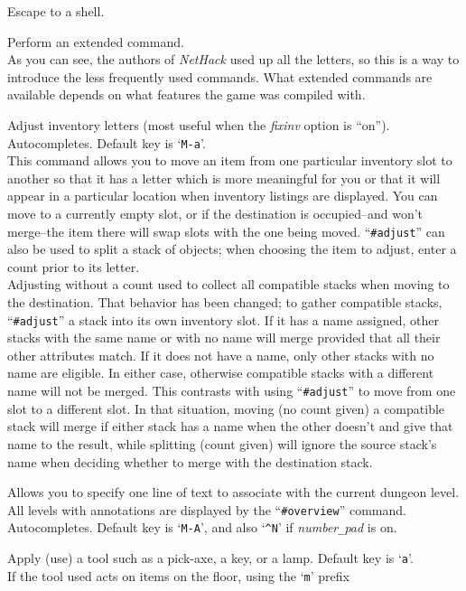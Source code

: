 Escape to a shell.
\item[\tb{\#}]
Perform an extended command.\\
As you can see, the authors of {\it NetHack\/}
used up all the letters, so this is a way to introduce the less frequently
used commands.
What extended commands are available depends on what features
the game was compiled with.
\item[\tb{\#adjust}]
Adjust inventory letters (most useful when the
{\it fixinv\/}
option is ``on''). Autocompletes. Default key is `{\tt M-a}'.\\
This command allows you to move an item from one particular inventory
slot to another so that it has a letter which is more meaningful for you
or that it will appear in a particular location when inventory listings
are displayed.
You can move to a currently empty slot, or if the destination is
occupied--and won't merge--the item there will swap slots with the one
being moved.
``{\tt \#adjust}'' can also be used to split a stack of objects; when
choosing the item to adjust, enter a count prior to its letter.\\
Adjusting without a count used to collect all compatible stacks when
moving to the destination.  That behavior has been changed; to gather
compatible stacks, ``{\tt \#adjust}'' a stack into its own inventory slot.
If it has a name assigned, other stacks with the same name or with
no name will merge provided that all their other attributes match.
If it does not have a name, only other stacks with no name are eligible.
In either case, otherwise compatible stacks with a different name
will not be merged.  This contrasts with using ``{\tt \#adjust}'' to move
from one slot to a different slot.  In that situation, moving (no
count given) a compatible stack will merge if either stack has a
name when the other doesn't and give that name to the result, while
splitting (count given) will ignore the source stack's name when
deciding whether to merge with the destination stack.
\item[\tb{\#annotate}]
Allows you to specify one line of text to associate with the current
dungeon level.  All levels with annotations are displayed by the
``{\tt \#overview}'' command. Autocompletes.
Default key is `{\tt M-A}',
and also `{\tt \^{}N}' if {\it number\verb+_+pad\/} is on.
\item[\tb{\#apply}]
Apply (use) a tool such as a pick-axe, a key, or a lamp.
Default key is `{\tt a}'.\\
If the tool used acts on items on the floor, using the `{\tt m}' prefix
